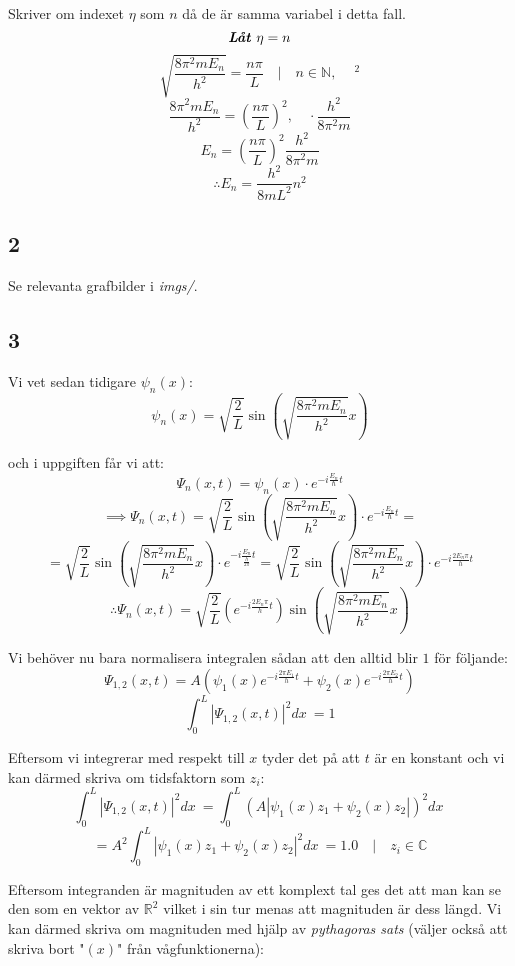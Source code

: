 \documentclass{article}
\begin{document}
Skriver om indexet $\eta$ som $n$ då de är samma variabel i detta fall. 
$$
\textbf{\emph{Låt $\eta = n$}}
$$
$$
\sqrt{\frac{8 \pi^2 m E_n}{h^2}} = \frac{n\pi}{L} \quad | \quad n \in \mathbb{N}, \quad \ ^2
$$
$$
\frac{8 \pi^2 m E_n}{h^2} = \left(\frac{n\pi}{L}\right)^2, \quad \cdot \frac{h^2}{8 \pi^2 m}
$$
$$
E_n = \left(\frac{n\pi}{L}\right)^2 \frac{h^2}{8 \pi^2 m} 
$$
\begin{equation} \label{energy_n}
\therefore E_n = \frac{h^2}{8mL^2} n^2
\end{equation}

\subsection{2}
Se relevanta grafbilder i \emph{imgs/}.

\subsection{3}

Vi vet sedan tidigare $\psi_n(x)$:
$$
\psi_n(x) = \sqrt{ \frac{2}{L} } \sin \left( \sqrt{\frac{8 \pi^2 m E_n}{h^2}} x \right)
$$

och i uppgiften får vi att:
$$
\Psi_n(x, t) = \psi_n(x) \cdot e^{-i \frac{E_n}{\hbar}t }
$$
$$
\implies \Psi_n(x, t) = \sqrt{ \frac{2}{L} } \sin \left( \sqrt{\frac{8 \pi^2 m E_n}{h^2}} x \right) \cdot e^{-i \frac{E_n}{\hbar}t } =
$$
$$
= \sqrt{ \frac{2}{L} } \sin \left( \sqrt{\frac{8 \pi^2 m E_n}{h^2}} x \right) \cdot e^{-i \frac{E_n}{ \frac{h}{2\pi} }t } 
= \sqrt{ \frac{2}{L} } \sin \left( \sqrt{\frac{8 \pi^2 m E_n}{h^2}} x \right) \cdot e^{-i \frac{2 E_n \pi}{h}t } 
$$
$$
\therefore \Psi_n(x,t) = \sqrt{ \frac{2}{L} } \left(e^{-i \frac{2 E_n \pi}{h}t }\right) \sin \left( \sqrt{\frac{8 \pi^2 m E_n}{h^2}} x \right) 
$$

Vi behöver nu bara normalisera integralen sådan att den alltid blir $1$ för följande:
$$
\Psi_{1,2}(x, t) = A \left( \psi_1(x)e^{-i \frac{2\pi E_1}{h}t } + \psi_2(x)e^{-i \frac{2\pi E_2}{h}t } \right)
$$
$$
\int_0^L |\Psi_{1,2}(x, t)|^2 dx\ = 1
$$

Eftersom vi integrerar med respekt till $x$ tyder det på att $t$ är en konstant och vi kan därmed skriva om tidsfaktorn som $z_i$:
$$
\int_0^L |\Psi_{1,2}(x, t)|^2 dx\ = \int_0^L \left(A |\psi_1(x)z_1 + \psi_2(x)z_2| \right)^2 dx\
$$
$$
= A^2 \int_0^L |\psi_1(x)z_1 + \psi_2(x)z_2|^2 dx\ = 1.0 \quad | \quad z_i \in \mathbb{C}
$$

Eftersom integranden är magnituden av ett komplext tal ges det att man kan se den som en vektor av $\mathbb{R}^2$ vilket i sin tur menas att magnituden är dess längd. Vi kan därmed skriva om magnituden med hjälp av \emph{pythagoras sats} (väljer också att skriva bort "$(x)$" från vågfunktionerna):
\end{document}
